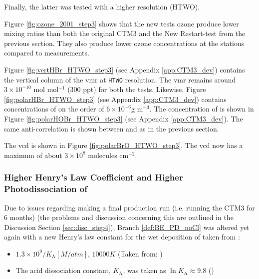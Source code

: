 Finally, the latter was tested with a higher resolution (HTWO). 

\medskip

Figure \ref{fig:ozone_2001_step3} shows that the new tests ozone produce lower mixing ratios than both the original CTM3 and the New Restart-test from the previous section. They also produce lower ozone concentrations at the stations compared to measurements. 





\medskip

Figure \ref{fig:vertHBr_HTWO_step3} (see Appendix \ref{app:CTM3_dev}) contains the vertical column of the  \acrshort{vmr} at \texttt{HTWO} resolution. The \acrshort{vmr} remains around $3\times10^{-10}$ mol mol$^{-1}$ (300 ppt) for both the tests. Likewise, Figure \ref{fig:polarHBr_HTWO_step3} (see Appendix \ref{app:CTM3_dev}) contains concentrations of  on the order of $6\times10^{-6} $g m$^{-3}$. The concentration of  is shown in Figure \ref{fig:polarHOBr_HTWO_step3} (see Appendix \ref{app:CTM3_dev}). The same anti-correlation is shown between  and  as in the previous section. 

\medskip

The  \acrshort{vcd} is shown in Figure \ref{fig:polarBrO_HTWO_step3}. The  \acrshort{vcd} now has a maximum of about $3\times10^8$ molecules cm$^{-2}$. 

\subsubsection{Higher Henry's Law Coefficient and Higher Photodissociation of }\label{sec:res_step4}

Due to issues regarding making a final production run (i.e. running the CTM3 for 6 months) (the problems and discussion concerning this are outlined in the Discussion Section \ref{sec:disc_step4}), Branch \ref{def:BE_PD_noCl} was altered yet again with a new Henry's law constant for the wet deposition of  taken from \cite{Sander99}: 

\begin{itemize}
    \item $1.3\times10^9/K_\text{A} [M/atm]$, $10 000 K$ (Taken from: \cite{Brimblecombe1988TheSA})
    \item The acid dissociation constant, $K_\text{A}$, was taken as $\ln{K_\text{A}} \approx 9.8$ (\cite{Levanov})
\end{itemize}

